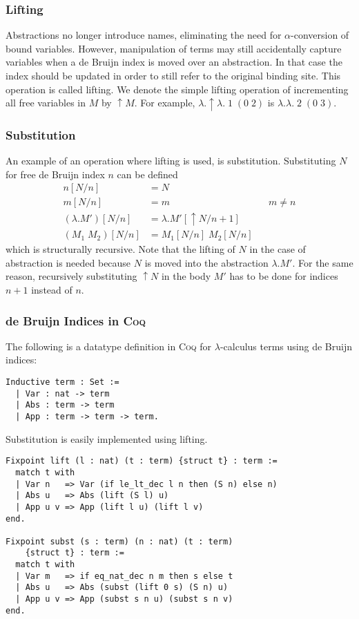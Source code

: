 \documentclass[a4paper,11pt]{article}
\newcommand{\name}[1]{\textsc{#1}\xspace}
\def\Coq{\name{Coq}}
\begin{document}
\subsubsection*{Lifting}

Abstractions no longer introduce names, eliminating the need for
$\alpha$-conversion of bound variables.
However, manipulation of terms may still accidentally capture
variables when a de Bruijn index is moved over an abstraction.
In that case the index should be updated in order to still refer to the
original binding site.
This operation is called lifting. We denote the simple lifting operation
of incrementing all free variables in $M$ by $\uparrow \! M$. For
example, $\lambda . \uparrow \! \lambda . \; 1 \; (0 \; 2)$ is
$\lambda . \lambda . \; 2 \; (0 \; 3)$.

\subsubsection*{Substitution}

An example of an operation where lifting is used, is substitution.
Substituting $N$ for free de Bruijn index $n$ can be defined
\begin{align*}
  n[N/n]             &= N\\
  m[N/n]             &= m                    && \text{$m \neq n$} \\
  (\lambda .M')[N/n] &= \lambda .M'[\uparrow \! N / n\!+\!1]\\
  (M_1 \; M_2)[N/n]  &= M_1[N/n] \; M_2[N/n]
\end{align*}
which is structurally recursive.
Note that the lifting of $N$ in the case of abstraction is needed because
$N$ is moved into the abstraction $\lambda.M'$.
For the same reason, recursively substituting $\uparrow \! N$ in the body
$M'$ has to be done for indices $n+1$ instead of $n$.

\subsubsection*{de Bruijn Indices in \Coq}

The following is a datatype definition in \Coq for $\lambda$-calculus
terms using de Bruijn indices:
\begin{lstlisting}
Inductive term : Set :=
  | Var : nat -> term
  | Abs : term -> term
  | App : term -> term -> term.
\end{lstlisting}
Substitution is easily implemented using lifting.
\begin{lstlisting}
Fixpoint lift (l : nat) (t : term) {struct t} : term :=
  match t with
  | Var n   => Var (if le_lt_dec l n then (S n) else n)
  | Abs u   => Abs (lift (S l) u)
  | App u v => App (lift l u) (lift l v)
end.

Fixpoint subst (s : term) (n : nat) (t : term)
    {struct t} : term :=
  match t with
  | Var m   => if eq_nat_dec n m then s else t
  | Abs u   => Abs (subst (lift 0 s) (S n) u)
  | App u v => App (subst s n u) (subst s n v)
end.
\end{lstlisting}
\end{document}

